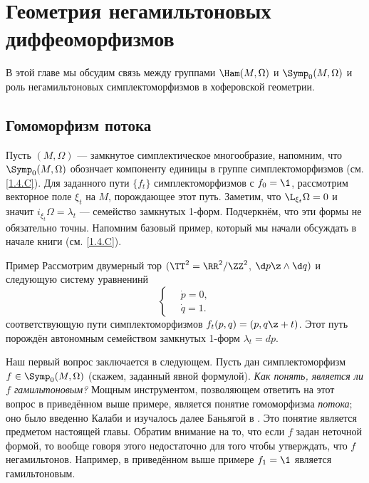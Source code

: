 \chapter[Негамильтоновы диффеоморфизмы]{Геометрия негамильтоновых диффеоморфизмов}\label{chap:14}

В этой главе мы обсудим связь между группами $\Ham(M,\Omega)$ и $\Symp_0(M,\Omega)$ и роль негамильтоновых симплектоморфизмов в хоферовской геометрии.

\section{Гомоморфизм потока}\label{sec:14.1}

Пусть $(M,\Omega)$ — замкнутое симплектическое многообразие,
напомним, что $\Symp_0(M,\Omega)$ обознчает компоненту единицы в
группе симплектоморфизмов (см. \ref{1.4.C}).
Для заданного пути $\{f_t\}$ симплектоморфизмов с $f_0 = \1$,
рассмотрим векторное поле $\xi_t$ на $M$, порождающее этот путь.
Заметим, что $\L_{\xi_t}\Omega=0$ и значит
$i_{\xi_t}\Omega=\lambda_t$ — семейство замкнутых 1-форм.
Подчеркнём, что эти формы не обязательно точны.
Напомним базовый пример, который мы начали обсуждать в начале книги
(см. \ref{1.4.C}). 


\begin{thm}{Пример}\label{14.1.A}
Рассмотрим двумерный тор $(\TT^2=\RR^2/\ZZ^2$, $\d p\z\wedge \d q)$ и
следующую систему уравненинй 
\[
\begin{cases}
\quad\dot p=0,
\\
\quad\dot q=1.
\end{cases}
\]
соответствующую пути симплектоморфизмов $f_t(p, q) = (p, q \z+ t)$.
Этот путь порождён автономным семейством замкнутых 1-форм $\lambda_t = dp$.
\end{thm}


Наш первый вопрос заключается в следующем.
Пусть дан симплектоморфизм $f\in\Symp_0(M,\Omega)$ (скажем, заданный
явной формулой).
\textit{Как понять, является ли $f$ гамильтоновым?}
Мощным инструментом, позволяющем ответить на этот вопрос в приведённом
выше примере, является понятие гомоморфизма \emph{потока}; оно было
введенно Калаби и изучалось далее
Баньягой в \cite{B1}.
Это понятие является предметом настоящей главы.
Обратим внимание на то, что если $f$ задан неточной формой, то вообще
говоря этого недостаточно для того чтобы утверждать, что $f$
негамильтонов.
Например, в приведённом выше примере $f_1 = \1$ является гамильтоновым.

